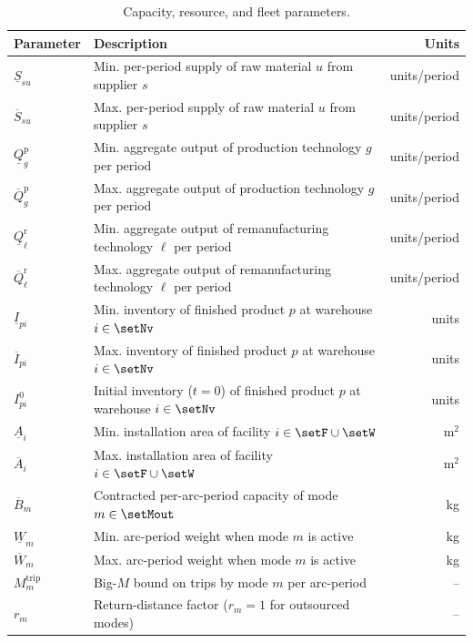 \begin{table}[htbp]
\centering
\caption{Capacity, resource, and fleet parameters.}
\label{tab:capacity_params}
\footnotesize
\renewcommand{\arraystretch}{1.15}
\begin{tabularx}{\textwidth}{@{}lXr@{}}
\toprule
Parameter & Description & Units \\
\midrule
$\underline{S}_{su}$ & Min. per-period supply of raw material $u$ from supplier $s$ & units/period \\
$\overline{S}_{su}$ & Max. per-period supply of raw material $u$ from supplier $s$ & units/period \\
$\underline{Q}^{\mathrm{p}}_{g}$ & Min. aggregate output of production technology $g$ per period & units/period \\
$\overline{Q}^{\mathrm{p}}_{g}$ & Max. aggregate output of production technology $g$ per period & units/period \\
$\underline{Q}^{\mathrm{r}}_{\ell}$ & Min. aggregate output of remanufacturing technology $\ell$ per period & units/period \\
$\overline{Q}^{\mathrm{r}}_{\ell}$ & Max. aggregate output of remanufacturing technology $\ell$ per period & units/period \\
$\underline{I}_{pi}$ & Min. inventory of finished product $p$ at warehouse $i\in\setNv$ & units \\
$\overline{I}_{pi}$ & Max. inventory of finished product $p$ at warehouse $i\in\setNv$ & units \\
$I^{0}_{pi}$ & Initial inventory ($t=0$) of finished product $p$ at warehouse $i\in\setNv$ & units \\
$\underline{A}_{i}$ & Min. installation area of facility $i\in\setF\cup\setW$ & m$^2$ \\
$\overline{A}_{i}$ & Max. installation area of facility $i\in\setF\cup\setW$ & m$^2$ \\
$\overline{B}_m$ & Contracted per-arc-period capacity of mode $m\in\setMout$ & kg \\
$\underline{W}_{m}$ & Min. arc-period weight when mode $m$ is active & kg \\
$\overline{W}_{m}$ & Max. arc-period weight when mode $m$ is active & kg \\
$M^{\mathrm{trip}}_m$ & Big-$M$ bound on trips by mode $m$ per arc-period & -- \\
$r_m$ & Return-distance factor ($r_m=1$ for outsourced modes) & -- \\

\end{tabularx}
\end{table}
